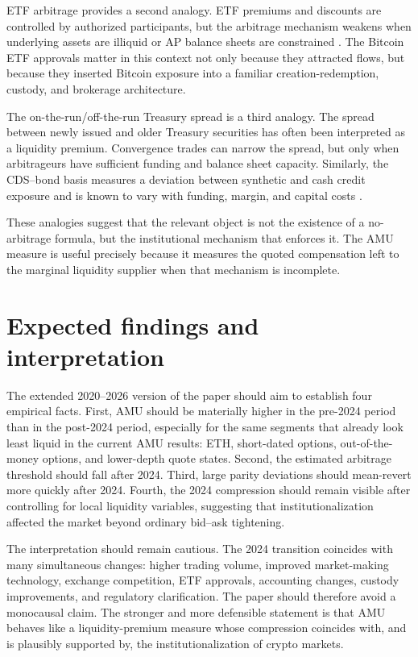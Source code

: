 \documentclass[12pt]{article}
\begin{document}
ETF arbitrage provides a second analogy. ETF premiums and discounts are controlled by authorized participants, but the arbitrage mechanism weakens when underlying assets are illiquid or AP balance sheets are constrained \citep{pan2017etf, todorov2021bond}. The Bitcoin ETF approvals matter in this context not only because they attracted flows, but because they inserted Bitcoin exposure into a familiar creation-redemption, custody, and brokerage architecture.

The on-the-run/off-the-run Treasury spread is a third analogy. The spread between newly issued and older Treasury securities has often been interpreted as a liquidity premium. Convergence trades can narrow the spread, but only when arbitrageurs have sufficient funding and balance sheet capacity. Similarly, the CDS--bond basis measures a deviation between synthetic and cash credit exposure and is known to vary with funding, margin, and capital costs \citep{garleanu2011margin, duffie2010presidential}.

These analogies suggest that the relevant object is not the existence of a no-arbitrage formula, but the institutional mechanism that enforces it. The AMU measure is useful precisely because it measures the quoted compensation left to the marginal liquidity supplier when that mechanism is incomplete.

\section{Expected findings and interpretation}

The extended 2020--2026 version of the paper should aim to establish four empirical facts. First, AMU should be materially higher in the pre-2024 period than in the post-2024 period, especially for the same segments that already look least liquid in the current AMU results: ETH, short-dated options, out-of-the-money options, and lower-depth quote states. Second, the estimated arbitrage threshold should fall after 2024. Third, large parity deviations should mean-revert more quickly after 2024. Fourth, the 2024 compression should remain visible after controlling for local liquidity variables, suggesting that institutionalization affected the market beyond ordinary bid--ask tightening.

The interpretation should remain cautious. The 2024 transition coincides with many simultaneous changes: higher trading volume, improved market-making technology, exchange competition, ETF approvals, accounting changes, custody improvements, and regulatory clarification. The paper should therefore avoid a monocausal claim. The stronger and more defensible statement is that AMU behaves like a liquidity-premium measure whose compression coincides with, and is plausibly supported by, the institutionalization of crypto markets.
\end{document}
